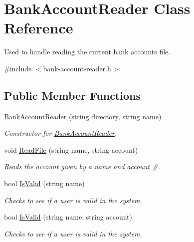\hypertarget{classBankAccountReader}{
\section{BankAccountReader Class Reference}
\label{classBankAccountReader}
}


Used to handle reading the current bank accounts file.  




{\ttfamily \#include $<$bank-\/account-\/reader.h$>$}

\subsection*{Public Member Functions}
\begin{DoxyCompactItemize}
\item 
\hyperlink{classBankAccountReader_a5ff301528a8bfc7e3326d3429fd86584}{BankAccountReader} (string directory, string name)
\begin{DoxyCompactList}\small\item\em Constructor for \hyperlink{classBankAccountReader}{BankAccountReader}. \item\end{DoxyCompactList}\item 
void \hyperlink{classBankAccountReader_a117e91a7d1efefa4bf0b5205dcaef3c3}{ReadFile} (string name, string account)
\begin{DoxyCompactList}\small\item\em Reads the account given by a name and account \#. \item\end{DoxyCompactList}\item 
bool \hyperlink{classBankAccountReader_abde5fcd9a4f59f7e3de810ea51b2a0b5}{IsValid} (string name)
\begin{DoxyCompactList}\small\item\em Checks to see if a user is valid in the system. \item\end{DoxyCompactList}\item 
bool \hyperlink{classBankAccountReader_ae12dd7be7d621c62b892526d78afd564}{IsValid} (string name, string account)
\begin{DoxyCompactList}\small\item\em Checks to see if a user is valid in the system. \item\end{DoxyCompactList}\item 

\end{DoxyCompactItemize}
